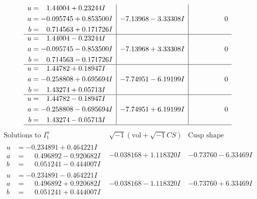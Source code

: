 \documentclass[1p]{elsarticle_modified}
\theoremstyle{definition}
\newcommand{\I}{\sqrt{-1}}
\begin{document}
$$\begin{array}{c|c|c}
\begin{aligned}
u &= \phantom{-}1.44004 + 0.23244 I \\
a &= -0.095745 + 0.853500 I \\
b &= \phantom{-}0.714563 + 0.171726 I\end{aligned}
 & -7.13968 - 3.33308 I & \phantom{-0.000000 } 0 \\ \hline\begin{aligned}
u &= \phantom{-}1.44004 - 0.23244 I \\
a &= -0.095745 - 0.853500 I \\
b &= \phantom{-}0.714563 - 0.171726 I\end{aligned}
 & -7.13968 + 3.33308 I & \phantom{-0.000000 } 0 \\ \hline\begin{aligned}
u &= \phantom{-}1.44782 + 0.18947 I \\
a &= -0.258808 + 0.695694 I \\
b &= \phantom{-}1.43274 + 0.05713 I\end{aligned}
 & -7.74951 - 6.19199 I & \phantom{-0.000000 } 0 \\ \hline\begin{aligned}
u &= \phantom{-}1.44782 - 0.18947 I \\
a &= -0.258808 - 0.695694 I \\
b &= \phantom{-}1.43274 - 0.05713 I\end{aligned}
 & -7.74951 + 6.19199 I & \phantom{-0.000000 } 0\\
 \hline 
 \end{array}$$\newpage$$\begin{array}{c|c|c}  
\text{Solutions to }I^u_{1}& \I (\text{vol} + \sqrt{-1}CS) & \text{Cusp shape}\\
 \hline 
\begin{aligned}
u &= -0.234891 + 0.464221 I \\
a &= \phantom{-}0.496892 - 0.920682 I \\
b &= \phantom{-}0.051241 - 0.444007 I\end{aligned}
 & -0.038168 + 1.118320 I & -0.73760 - 6.33469 I \\ \hline\begin{aligned}
u &= -0.234891 - 0.464221 I \\
a &= \phantom{-}0.496892 + 0.920682 I \\
b &= \phantom{-}0.051241 + 0.444007 I\end{aligned}
 & -0.038168 - 1.118320 I & -0.73760 + 6.33469 I \\ \hline\begin{aligned}

\end{aligned}
\end{array}$$
\end{document}
